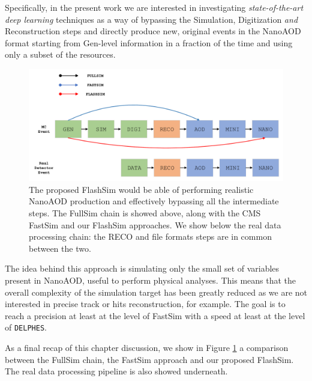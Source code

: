 Specifically, in the present work we are interested in investigating \emph{state-of-the-art deep learning} techniques as a way of bypassing the Simulation, Digitization \emph{and} Reconstruction steps and directly produce new, original events in the NanoAOD format starting from Gen-level information in a fraction of the time and using only a subset of the resources.

\begin{figure}
    \centering
    \includegraphics[width=\columnwidth]{gfx/ch2/sim_comp.pdf}
    \caption[Simulation comparison]{The proposed FlashSim would be able of performing realistic NanoAOD production and effectively bypassing all the intermediate steps. The FullSim chain is showed above, along with the CMS FastSim and our FlashSim approaches. We show below the real data processing chain: the RECO and file formats steps are in common between the two.}
    \label{fig:sim_comp}
\end{figure}

The idea behind this approach is simulating only the small set of variables present in NanoAOD, useful to perform physical analyses. This means that the overall complexity of the simulation target has been greatly reduced as we are not interested in precise track or hits reconstruction, for example. The goal is to reach a precision at least at the level of FastSim with a speed at least at the level of \texttt{DELPHES}.

As a final recap of this chapter discussion, we show in Figure \ref{fig:sim_comp} a comparison between the FullSim chain, the FastSim approach and our proposed FlashSim. The real data processing pipeline is also showed underneath.
